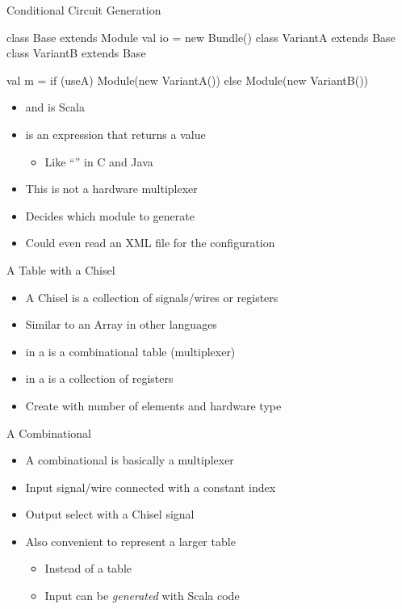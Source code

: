 \begin{frame}[fragile]{Conditional Circuit Generation}
\begin{chisel}
class Base extends Module { val io = new Bundle() }
class VariantA extends Base { }
class VariantB extends Base { }

val m = if (useA) Module(new VariantA())
        else Module(new VariantB())
\end{chisel}
\begin{itemize}
\item {} and  is Scala
\item {} is an expression that returns a value
\begin{itemize}
\item Like ``'' in C and Java
\end{itemize}
\item This is not a hardware multiplexer
\item Decides which module to generate
\item Could even read an XML file for the configuration
\end{itemize}
\end{frame}


\begin{frame}[fragile]{A Table with a Chisel }
\begin{itemize}
\item A Chisel  is a collection of signals/wires or registers
\item Similar to an Array in other languages
\item {} in a  is a combinational table (multiplexer)
\item {} in a  is a collection of registers
\item Create with number of elements and hardware type
\end{itemize}
\end{frame}

\begin{frame}[fragile]{A Combinational }
\begin{itemize}
\item A combinational  is basically a multiplexer
\item Input signal/wire connected with a constant index
\item Output select with a Chisel  signal
\end{itemize}
\begin{itemize}
\item Also convenient to represent a larger table
\begin{itemize}
\item Instead of a  table
\item Input can be \emph{generated} with Scala code
\end{itemize}
\end{itemize}
\end{frame}

